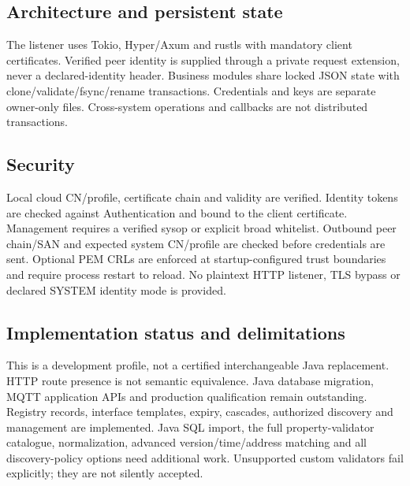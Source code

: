\documentclass[a4paper]{arrowhead}
\begin{document}
\subsection{Architecture and persistent state}
The listener uses Tokio, Hyper/Axum and rustls with mandatory client certificates. Verified peer identity is supplied through a private request extension, never a declared-identity header. Business modules share locked JSON state with clone/validate/fsync/rename transactions. Credentials and keys are separate owner-only files. Cross-system operations and callbacks are not distributed transactions.
\subsection{Security}
Local cloud CN/profile, certificate chain and validity are verified. Identity tokens are checked against Authentication and bound to the client certificate. Management requires a verified sysop or explicit broad whitelist. Outbound peer chain/SAN and expected system CN/profile are checked before credentials are sent. Optional PEM CRLs are enforced at startup-configured trust boundaries and require process restart to reload. No plaintext HTTP listener, TLS bypass or declared SYSTEM identity mode is provided.
\subsection{Implementation status and delimitations}
This is a development profile, not a certified interchangeable Java replacement. HTTP route presence is not semantic equivalence. Java database migration, MQTT application APIs and production qualification remain outstanding.
Registry records, interface templates, expiry, cascades, authorized discovery and management are implemented. Java SQL import, the full property-validator catalogue, normalization, advanced version/time/address matching and all discovery-policy options need additional work. Unsupported custom validators fail explicitly; they are not silently accepted.
\clearpage
\end{document}
